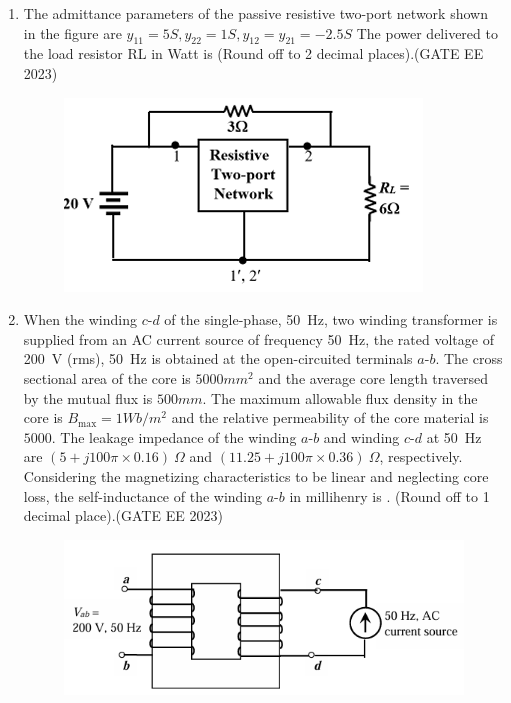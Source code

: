 \documentclass[a4paper,12pt]{exam}
\theoremstyle{remark}
\begin{document}
\begin{enumerate}
 \item The admittance parameters of the passive resistive two-port network shown in the 
figure are 
$y_{11}=5S, y_{22}=1 S, y_{12}=y_{21} = -2.5 S $
The power delivered to the load resistor RL in Watt is  (Round off to 2 
decimal places).\hfill{(GATE EE 2023)}
\begin{figure}[H]
    \centering
    \includegraphics[width=0.5 \columnwidth]{figs/Q 52.png}
    \caption{}
    \label{fig:placeholder}
\end{figure}
\item When the winding $c$-$d$ of the single-phase, 50~Hz, two winding transformer is supplied from an AC current source of frequency 50~Hz, the rated voltage of 200~V (rms), 50~Hz is obtained at the open-circuited terminals $a$-$b$. The cross sectional area of the core is $5000 mm^2$ and the average core length traversed by the mutual flux is $500 mm$. The maximum allowable flux density in the core is $B_{\text{max}} = 1 Wb/m^2$ and the relative permeability of the core material is $5000$. The leakage impedance of the winding $a$-$b$ and winding $c$-$d$ at 50~Hz are $(5 + j100\pi \times 0.16)~\Omega$ and $(11.25 + j100\pi \times 0.36)~\Omega$, respectively. Considering the magnetizing characteristics to be linear and neglecting core loss, the self-inductance of the winding $a$-$b$ in millihenry is \underline{\hspace{2cm}}. (Round off to 1 decimal place).\hfill{(GATE EE 2023)}
\begin{figure}[H]
    \centering
    \includegraphics[width=0.5 \columnwidth]{figs/Q 53.png}
    \caption{}
    \label{fig:placeholder}
\end{figure}


\end{enumerate}
\end{document}

